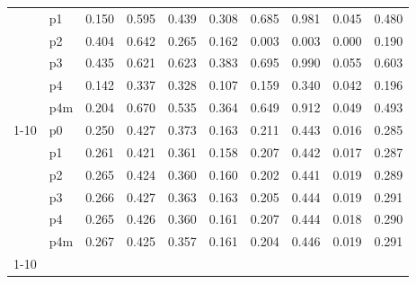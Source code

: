 \begin{tabular}{llrrrrrrrr}
 & p1 & 0.150 & 0.595 & 0.439 & 0.308 & 0.685 & 0.981 & 0.045 & 0.480 \\
 & p2 & 0.404 & 0.642 & 0.265 & 0.162 & 0.003 & 0.003 & 0.000 & 0.190 \\
 & p3 & 0.435 & 0.621 & 0.623 & 0.383 & 0.695 & 0.990 & 0.055 & 0.603 \\
 & p4 & 0.142 & 0.337 & 0.328 & 0.107 & 0.159 & 0.340 & 0.042 & 0.196 \\
 & p4m & 0.204 & 0.670 & 0.535 & 0.364 & 0.649 & 0.912 & 0.049 & 0.493 \\
\cline{1-10}
\multirow[t]{6}{*}{VL-JEPA} & p0 & 0.250 & 0.427 & 0.373 & 0.163 & 0.211 & 0.443 & 0.016 & 0.285 \\
 & p1 & 0.261 & 0.421 & 0.361 & 0.158 & 0.207 & 0.442 & 0.017 & 0.287 \\
 & p2 & 0.265 & 0.424 & 0.360 & 0.160 & 0.202 & 0.441 & 0.019 & 0.289 \\
 & p3 & 0.266 & 0.427 & 0.363 & 0.163 & 0.205 & 0.444 & 0.019 & 0.291 \\
 & p4 & 0.265 & 0.426 & 0.360 & 0.161 & 0.207 & 0.444 & 0.018 & 0.290 \\
 & p4m & 0.267 & 0.425 & 0.357 & 0.161 & 0.204 & 0.446 & 0.019 & 0.291 \\
\cline{1-10}
\bottomrule
\end{tabular}
